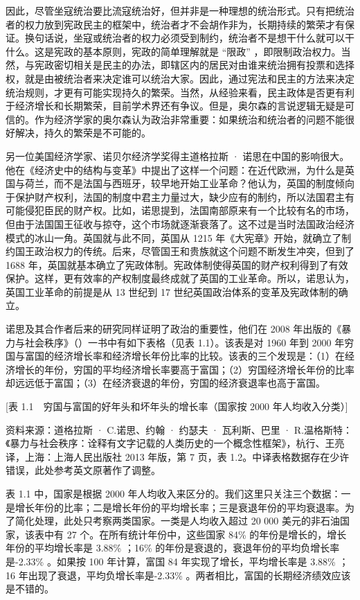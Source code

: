 因此，尽管坐寇统治要比流寇统治好，但并非是一种理想的统治形式。只有把统治者的权力放到宪政民主的框架中，统治者才不会胡作非为，长期持续的繁荣才有保证。换句话说，坐寇或统治者的权力必须受到制约，统治者不是想干什么就可以干什么。这是宪政的基本原则，宪政的简单理解就是 “限政” ，即限制政治权力。当然，与宪政密切相关是民主的办法，即辖区内的居民对由谁来统治拥有投票和选择权，就是由被统治者来决定谁可以统治大家。因此，通过宪法和民主的方法来决定统治规则，才更有可能实现持久的繁荣。当然，从经验来看，民主政体是否更有利于经济增长和长期繁荣，目前学术界还有争议。但是，奥尔森的言说逻辑无疑是可信的。作为经济学家的奥尔森认为政治非常重要：如果统治和统治者的问题不能很好解决，持久的繁荣是不可能的。

另一位美国经济学家、诺贝尔经济学奖得主道格拉斯 · 诺思在中国的影响很大。他在《经济史中的结构与变革》中提出了这样一个问题：在近代欧洲，为什么是英国与荷兰，而不是法国与西班牙，较早地开始工业革命？他认为，英国的制度倾向于保护财产权利，法国的制度中君主力量过大，缺少应有的制约，所以法国君主有可能侵犯臣民的财产权。比如，诺思提到，法国南部原来有一个比较有名的市场，但由于法国国王征收与掠夺，这个市场就逐渐衰落了。这不过是当时法国政治经济模式的冰山一角。英国就与此不同，英国从 1215 年《大宪章》开始，就确立了制约国王政治权力的传统。后来，尽管国王和贵族就这个问题不断发生冲突，但到了 1688 年，英国就基本确立了宪政体制。宪政体制使得英国的财产权利得到了有效保护。这样，更有效率的产权制度最终成就了英国的工业革命。所以，诺思认为，英国工业革命的前提是从 13 世纪到 17 世纪英国政治体系的变革及宪政体制的确立。

诺思及其合作者后来的研究同样证明了政治的重要性，他们在 2008 年出版的《暴力与社会秩序》（）一书中有如下表格（见表 1.1）。该表是对 1960 年到 2000 年穷国与富国的经济增长率和经济增长年份比率的比较。该表的三个发现是：（1）在经济增长的年份，穷国的平均经济增长率要高于富国；（2）穷国经济增长年份的比率却远远低于富国；（3）在经济衰退的年份，穷国的经济衰退率也高于富国。

[表 1.1　穷国与富国的好年头和坏年头的增长率（国家按 2000 年人均收入分类）]

资料来源：道格拉斯 · C.诺思、约翰 · 约瑟夫 · 瓦利斯、巴里 · R.温格斯特：《暴力与社会秩序：诠释有文字记载的人类历史的一个概念性框架》，杭行、王亮译，上海：上海人民出版社 2013 年版，第 7 页，表 1.2。中译表格数据存在少许错误，此处参考英文原著作了调整。

表 1.1 中，国家是根据 2000 年人均收入来区分的。我们这里只关注三个数据：一是增长年份的比率；二是增长年份的平均增长率；三是衰退年份的平均衰退率。为了简化处理，此处只考察两类国家。一类是人均收入超过 20 000 美元的非石油国家，该表中有 27 个。在所有统计年份中，这些国家 84\% 的年份是增长的，增长年份的平均增长率是 3.88\% ；16\% 的年份是衰退的，衰退年份的平均负增长率是-2.33\% 。如果按 100 年计算，富国 84 年实现了增长，平均增长率是 3.88\% ；16 年出现了衰退，平均负增长率是-2.33\% 。两者相比，富国的长期经济绩效应该是不错的。

